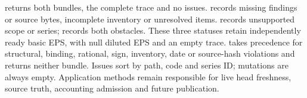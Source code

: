  returns both bundles, the complete trace and no
issues.  records missing findings or source bytes, incomplete
inventory or unresolved items.  records unsupported scope
or series;  records both obstacles. These three statuses retain
independently ready basic EPS, with null diluted EPS and an empty trace.
 takes precedence for structural, binding, rational, sign,
inventory, date or source-hash violations and returns neither bundle. Issues
sort by path, code and series ID; mutations are always empty. Application
methods remain responsible for live head freshness, source truth, accounting
admission and future publication.
